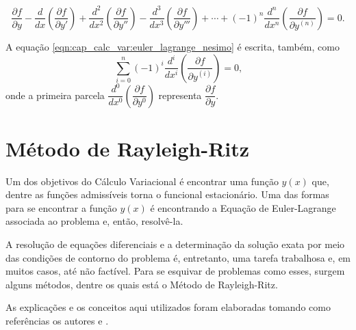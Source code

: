 \documentclass[
	12pt,				%
	openright,			%
    twoside,			%
	a4paper,			%
	english,			%
	french,				%
	spanish,			%
	brazil				%
	]{abntex2}
\numberwithin{lema}{chapter}
\numberwithin{teorema}{chapter}
\numberwithin{definicao}{chapter}
\numberwithin{exemplo}{chapter}
\numberwithin{figure}{chapter}
\begin{document}
\begin{equation}
	\label{eqn:cap_calc_var:euler_lagrange_nesimo}
	\frac{\partial f}{\partial y}
	- \frac{d}{dx}\left ( \frac{\partial f}{\partial y'} \right )
	+ \frac{d^2}{dx^2}\left ( \frac{\partial f}{\partial y''} \right )
	- \frac{d^3}{dx^3}\left ( \frac{\partial f}{\partial y'''} \right )
	+ \cdots
	+ (-1)^n \frac{d^n}{dx^n}\left (\frac{\partial f}{\partial y^{(n)}} \right )
	= 0
	\text{.}
\end{equation}

A equação \eqref{eqn:cap_calc_var:euler_lagrange_nesimo} é escrita, também, como
$$
	\sum_{i=0}^n (-1)^i\frac{d^i}{dx^i}\left (
		\frac{\partial f}{\partial y^{(i)}}
	\right )
	= 0
	\text{,}
$$
onde a primeira parcela $\dfrac{d^0}{dx^0} \left ( \dfrac{\partial f}{\partial y^0} \right )$ representa $\dfrac{\partial f}{\partial y}$.




\chapter{Método de Rayleigh-Ritz}
\label{cap:mrr}

Um dos objetivos do Cálculo Variacional é encontrar uma função $y(x)$ que, dentre as funções admissíveis torna o funcional estacionário. Uma das formas para se encontrar a função $y(x)$ é encontrando a Equação de Euler-Lagrange associada ao problema e, então, resolvê-la. 

A resolução de equações diferenciais e a determinação da solução exata por meio das condições de contorno do problema é, entretanto,  uma tarefa trabalhosa e, em muitos casos, até não factível. Para se esquivar de problemas como esses, surgem alguns métodos, dentre os quais está o Método de Rayleigh-Ritz.

As explicações e os conceitos aqui utilizados foram elaboradas tomando como referências os autores  e .
\end{document}
